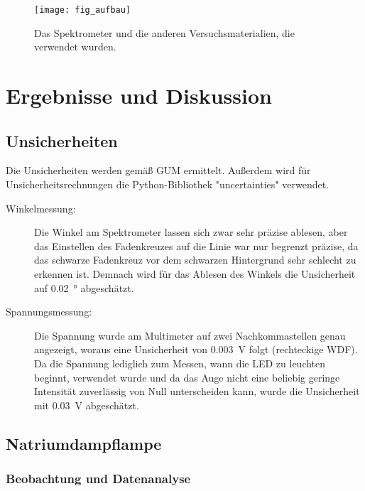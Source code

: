 \documentclass[
	a4paper,
	12pt,
	pagesize,
	ngerman
]{scrartcl}
\begin{document}
	\begin{figure}[H] 
		\texttt{[image: fig\_aufbau]}
		\centering
		\caption{Das Spektrometer und die anderen Versuchsmaterialien, die verwendet wurden. \cite{Aufbau}}
		\label{fig_aufbau}
		\centering
	\end{figure}

	\section{Ergebnisse und Diskussion}

	\subsection{Unsicherheiten}
	Die Unsicherheiten werden gemäß GUM ermittelt. 
	Außerdem wird für Unsicherheitsrechnungen die Python-Bibliothek "uncertainties" verwendet.
	\begin{description}
		\item[Winkelmessung:] Die Winkel am Spektrometer lassen sich zwar sehr präzise ablesen, aber das Einstellen des Fadenkreuzes auf die Linie war nur begrenzt präzise, da das schwarze Fadenkreuz vor dem schwarzen Hintergrund sehr schlecht zu erkennen ist.
		Demnach wird für das Ablesen des Winkels die Unsicherheit auf \SI{0,02}{\degree} abgeschätzt.
		\item[Spannungsmessung:] Die Spannung wurde am Multimeter auf zwei Nachkommastellen genau angezeigt, woraus eine Unsicherheit von \SI{0,003}{V} folgt (rechteckige WDF).
		Da die Spannung lediglich zum Messen, wann die LED zu leuchten beginnt, verwendet wurde und da das Auge nicht eine beliebig geringe Intensität zuverlässig von Null unterscheiden kann, wurde die Unsicherheit mit \SI{0,03}{V} abgeschätzt.
	\end{description}
	
	\subsection{Natriumdampflampe}
	\subsubsection{Beobachtung und Datenanalyse}
\end{document}
